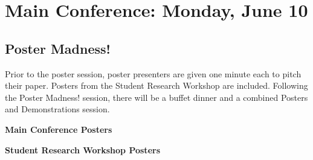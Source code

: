 \chapter{Main Conference: Monday, June 10}
\thispagestyle{emptyheader}

\newpage
\newpage

{}

\newpage



\section{Poster Madness!}

Prior to the poster session, poster presenters are given one minute each to pitch their
paper. Posters from the Student Research Workshop are included. Following the Poster Madness!
session, there will be a buffet dinner and a combined Posters and Demonstrations session.

\noindent
\vspace{1em}\par\centerline{\bfseries\large Main Conference Posters}\vspace{1em}\par


\noindent
\vspace{1em}\par\centerline{\bfseries\large Student Research Workshop Posters}\vspace{1em}\par
\noindent


